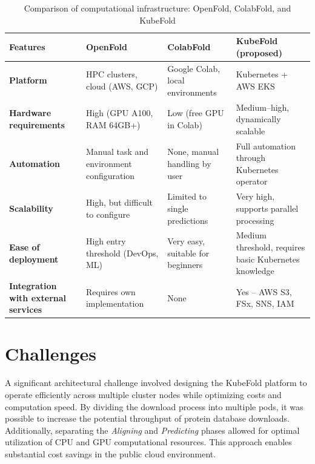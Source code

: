\begin{table}[H]
    \centering
    \caption{Comparison of computational infrastructure: OpenFold, ColabFold, and KubeFold}
    \label{tab:comparison}
    \small
    \begin{tabularx}{\textwidth}{|>{\centering\arraybackslash}X|>{\centering\arraybackslash}X|>{\centering\arraybackslash}X|>{\centering\arraybackslash}X|}
        \hline
        \textbf{Features}                           & \textbf{OpenFold}                         & \textbf{ColabFold}                & \textbf{KubeFold (proposed)}                          \\
        \hline
        \textbf{Platform}                           & HPC clusters, cloud (AWS, GCP)            & Google Colab, local environments & Kubernetes + AWS EKS \\
        \hline
        \textbf{Hardware requirements}              & High (GPU A100, RAM 64GB+)                & Low (free GPU in Colab) & Medium--high, dynamically scalable \\
        \hline
        \textbf{Automation}                         & Manual task and environment configuration & None, manual handling by user & Full automation through Kubernetes operator \\
        \hline
        \textbf{Scalability}                        & High, but difficult to configure          & Limited to single predictions & Very high, supports parallel processing \\
        \hline
        \textbf{Ease of deployment}                 & High entry threshold (DevOps, ML)         & Very easy, suitable for beginners & Medium threshold, requires basic Kubernetes knowledge \\
        \hline
        \textbf{Integration with external services} & Requires own implementation               & None                              & Yes – AWS S3, FSx, SNS, IAM                           \\
        \hline
    \end{tabularx}
\end{table}

\section{Challenges}

A significant architectural challenge involved designing the KubeFold platform to operate efficiently across multiple cluster nodes while optimizing costs and computation speed.
By dividing the download process into multiple pods, it was possible to increase the potential throughput of protein database downloads.
Additionally, separating the \textit{Aligning} and \textit{Predicting} phases allowed for optimal utilization of CPU and GPU computational resources.
This approach enables substantial cost savings in the public cloud environment.

